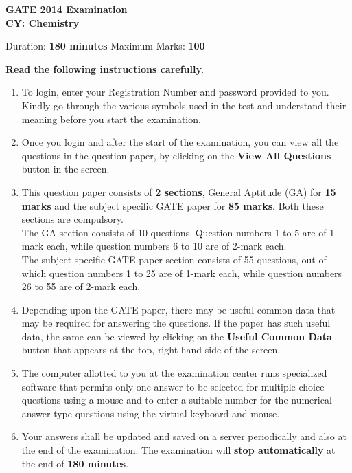 \documentclass[a4paper,10pt]{exam}
\theoremstyle{remark}
\begin{document}
\begin{center}
    \LARGE \textbf{GATE 2014 Examination} \\[2mm]
    \Large \textbf{CY: Chemistry}
\end{center}


\raggedright{{Duration:} \textbf{180 minutes} }\hfill Maximum Marks: \textbf{100}


\vspace{3mm}
\textbf{Read the following instructions carefully.}

\begin{enumerate}
    \item To login, enter your Registration Number and password provided to you. Kindly go through the various symbols used in the test and understand their meaning before you start the examination.
    \item Once you login and after the start of the examination, you can view all the questions in the question paper, by clicking on the \textbf{View All Questions} button in the screen.
    \item This question paper consists of \textbf{2 sections}, General Aptitude (GA) for \textbf{15 marks} and the subject specific GATE paper for \textbf{85 marks}. Both these sections are compulsory.\\
    The GA section consists of 10 questions. Question numbers 1 to 5 are of 1-mark each, while question numbers 6 to 10 are of 2-mark each.\\
    The subject specific GATE paper section consists of 55 questions, out of which question numbers 1 to 25 are of 1-mark each, while question numbers 26 to 55 are of 2-mark each.
    \item Depending upon the GATE paper, there may be useful common data that may be required for answering the questions. If the paper has such useful data, the same can be viewed by clicking on the \textbf{Useful Common Data} button that appears at the top, right hand side of the screen.
    \item The computer allotted to you at the examination center runs specialized software that permits only one answer to be selected for multiple-choice questions using a mouse and to enter a suitable number for the numerical answer type questions using the virtual keyboard and mouse.
    \item Your answers shall be updated and saved on a server periodically and also at the end of the examination. The examination will \textbf{stop automatically} at the end of \textbf{180 minutes}.

\end{enumerate}
\end{document}
